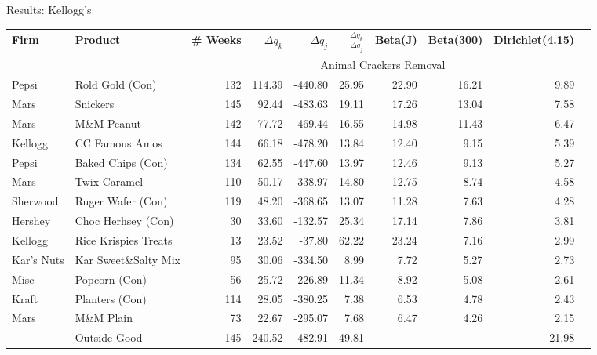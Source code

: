 \documentclass[aspectratio=169]{beamer}
\begin{document}
\begin{frame}{Results: Kellogg's}
\tiny
\begin{tabular}{ll |   r r r r  r r r  r}
Firm & Product & \# Weeks & $\Delta q_k$ & $\Delta q_j$ & $\frac{\Delta q_k}{\Delta q_j}$ & Beta(J) & Beta(300) & Dirichlet(4.15)\\ 
\hline  &&\multicolumn{7}{c}{Animal Crackers Removal}\\ \hline
Pepsi & Rold Gold (Con) & 132 & 114.39 & -440.80 & 25.95 & 22.90 & 16.21 & 9.89 \\
Mars & Snickers & 145 & 92.44 & -483.63 & 19.11 & 17.26 & 13.04 & 7.58 \\
Mars & M\&M Peanut & 142 & 77.72 & -469.44 & 16.55 & 14.98 & 11.43 & 6.47 \\
Kellogg & CC Famous Amos & 144 & 66.18 & -478.20 & 13.84 & 12.40 & 9.15 & 5.39 \\
Pepsi & Baked Chips (Con) & 134 & 62.55 & -447.60 & 13.97 & 12.46 & 9.13 & 5.27 \\
Mars & Twix Caramel & 110 & 50.17 & -338.97 & 14.80 & 12.75 & 8.74 & 4.58 \\
Sherwood & Ruger Wafer (Con) & 119 & 48.20 & -368.65 & 13.07 & 11.28 & 7.63 & 4.28 \\
Hershey & Choc Herhsey (Con) & 30 & 33.60 & -132.57 & 25.34 & 17.14 & 7.86 & 3.81 \\
Kellogg & Rice Krispies Treats & 13 & 23.52 & -37.80 & 62.22 & 23.24 & 7.16 & 2.99 \\
Kar's Nuts & Kar Sweet\&Salty Mix & 95 & 30.06 & -334.50 & 8.99 & 7.72 & 5.27 & 2.73 \\
Misc & Popcorn (Con) & 56 & 25.72 & -226.89 & 11.34 & 8.92 & 5.08 & 2.61 \\
Kraft & Planters (Con) & 114 & 28.05 & -380.25 & 7.38 & 6.53 & 4.78 & 2.43 \\
Mars & M\&M Plain & 73 & 22.67 & -295.07 & 7.68 & 6.47 & 4.26 & 2.15 \\
& Outside Good& 145 & 240.52 & -482.91 & 49.81 &  &  & 21.98 \\


\end{tabular}
\end{frame}
\end{document}

